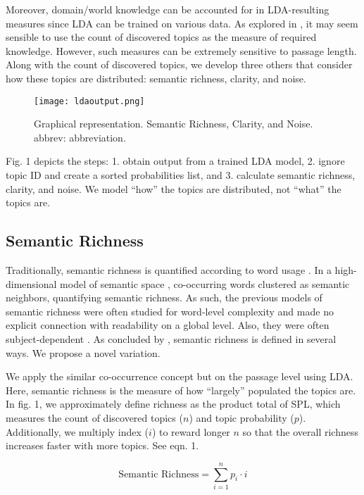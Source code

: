 \documentclass[11pt]{article}
\begin{document}
Moreover, domain/world knowledge can be accounted for in LDA-resulting measures since LDA can be trained on various data. As explored in \citet{qumsiyeh2011readaid}, it may seem sensible to use the count of discovered topics as the measure of required knowledge. However, such measures can be extremely sensitive to passage length. Along with the count of discovered topics, we develop three others that consider how these topics are distributed: semantic richness, clarity, and noise. 

\begin{figure}[]
    \centering
    \texttt{[image: ldaoutput.png]}
    \caption{Graphical representation. Semantic Richness, Clarity, and Noise. abbrev: abbreviation.}
    \label{fig:1}
\end{figure}

Fig. 1 depicts the steps: 1. obtain output from a trained LDA model, 2. ignore topic ID and create a sorted probabilities list, and 3. calculate semantic richness, clarity, and noise. We model ``how'' the topics are distributed, not ``what'' the topics are.

\subsection{Semantic Richness}
Traditionally, semantic richness is quantified according to word usage \citep{pexman:08}. In a high-dimensional model of semantic space \citep{li2000acquisition}, co-occurring words clustered as semantic neighbors, quantifying semantic richness. As such, the previous models of semantic richness were often studied for word-level complexity and made no explicit connection with readability on a global level. Also, they were often subject-dependent \citep{buchanan2001characterizing}. As concluded by \citet{pexman:08}, semantic richness is defined in several ways. We propose a novel variation.

We apply the similar co-occurrence concept but on the passage level using LDA. Here, semantic richness is the measure of how ``largely'' populated the topics are. In fig. 1, we approximately define richness as the product total of SPL, which measures the count of discovered topics ($n$) and topic probability ($p$). Additionally, we multiply index ($i$) to reward longer $n$ so that the overall richness increases faster with more topics. See eqn. 1.

\begin{equation} \label{eq1}
\text{Semantic Richness} = \sum_{i=1}^{n}  p_i \cdot i
\end{equation}
\end{document}
